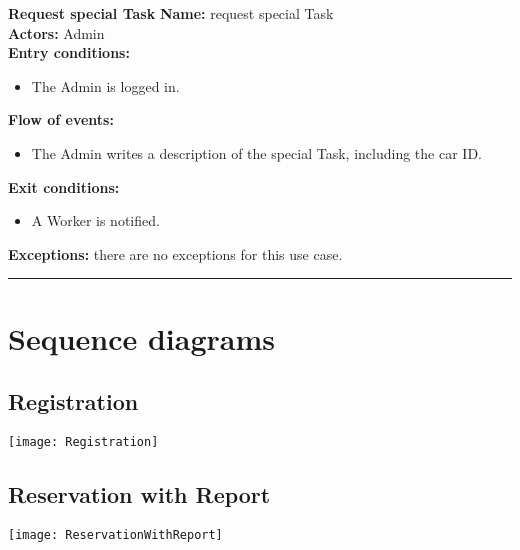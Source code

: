 \textbf{\large Request special Task}
\bigbreak
\textbf{Name:} request special Task \\
\textbf{Actors:} Admin \\
\textbf{Entry conditions:} 
\begin{itemize}
\item The Admin is logged in.
\end{itemize}
\textbf{Flow of events:} 
\begin{itemize}
\item The Admin writes a description of the special Task, including the car ID.
\end{itemize}
\textbf{Exit conditions:} 
\begin{itemize}
\item A Worker is notified.
\end{itemize}
\textbf{Exceptions:} there are no exceptions for this use case.\\


\begin{center}
\noindent\rule{8cm}{1.0pt}
\end{center}


\section{Sequence diagrams}
\subsection{Registration}
\begin{center}
\texttt{[image: Registration]}
\end{center}
\subsection{Reservation with Report}
\begin{center}
\texttt{[image: ReservationWithReport]}
\end{center}
